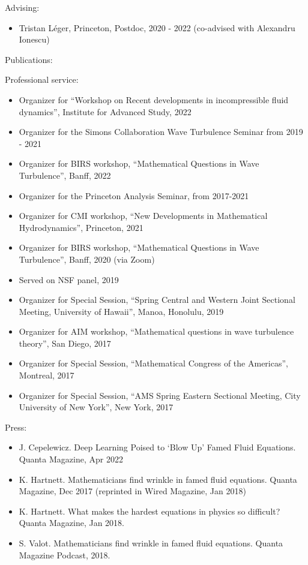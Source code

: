 \documentclass[10pt]{article}
\newcommand{\blankline}{\quad\pagebreak[2]}
\begin{document}
Advising:
\begin{itemize}
\item Tristan L\'eger, Princeton, Postdoc, 2020 - 2022 (co-advised with Alexandru Ionescu)
\end{itemize}




\blankline




Publications:
\nocite{*}
{}



\blankline

Professional service:
\begin{itemize}
\item Organizer for ``Workshop on Recent developments in incompressible fluid dynamics'', Institute for Advanced Study, 2022
\item Organizer for the Simons Collaboration Wave Turbulence Seminar from 2019 - 2021
\item Organizer for BIRS workshop, ``Mathematical Questions in Wave Turbulence'', Banff, 2022
\item Organizer for the Princeton Analysis Seminar, from 2017-2021
\item Organizer for CMI workshop, ``New Developments in Mathematical Hydrodynamics'', Princeton, 2021
\item Organizer for BIRS workshop, ``Mathematical Questions in Wave Turbulence'', Banff, 2020 (via Zoom)
\item Served on NSF panel, 2019
\item Organizer for Special Session, ``Spring Central and Western Joint Sectional Meeting, University of Hawaii'', Manoa, Honolulu, 2019 
\item Organizer for AIM workshop, ``Mathematical questions in wave turbulence theory'', San Diego, 2017 
\item Organizer for Special Session, ``Mathematical Congress of the Americas'', Montreal, 2017 
\item Organizer for Special Session, ``AMS Spring Eastern Sectional Meeting, City University of New York'', New York, 2017 
\end{itemize}


\blankline




Press:
\begin{itemize}
\item J. Cepelewicz. Deep Learning Poised to ‘Blow Up’ Famed Fluid Equations. Quanta Magazine, Apr 2022
\item K. Hartnett. Mathematicians find wrinkle in famed fluid equations. Quanta Magazine, Dec 2017 (reprinted in Wired Magazine, Jan 2018)	
\item K. Hartnett. What makes the hardest equations in physics so difficult? Quanta Magazine, Jan 2018.
\item S. Valot. Mathematicians find wrinkle in famed fluid equations. Quanta Magazine Podcast, 2018.
\end{itemize}
\blankline
\end{document}

